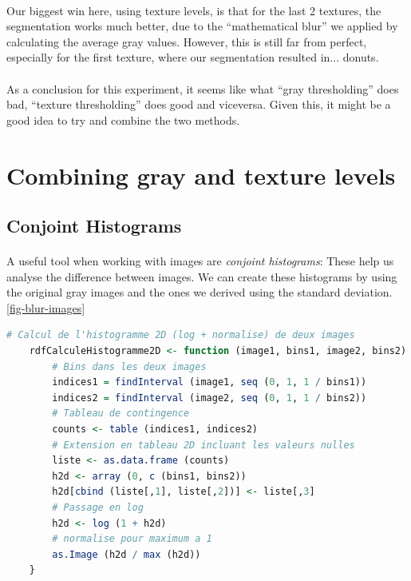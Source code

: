 \paragraph{}
Our biggest win here, using texture levels, is that for the last 2 textures, the segmentation works much better, due to the ``mathematical blur'' we applied by calculating the average gray values.
However, this is still far from perfect, especially for the first texture, where our segmentation resulted in... donuts.
\paragraph{}
As a conclusion for this experiment, it seems like what ``gray thresholding'' does bad, ``texture thresholding'' does good and viceversa.
Given this, it might be a good idea to try and combine the two methods.

\clearpage

\section{Combining gray and texture levels}
\subsection{Conjoint Histograms}
\paragraph{}
A useful tool when working with images are \emph{conjoint histograms}: \cite{wiki_conjoint_histograms}
These help us analyse the difference between images.
We can create these histograms by using the original gray images and the ones we derived using the standard deviation. \ref{fig-blur-images}

\begin{lstlisting}[language=R, caption=Calculating conjoint histograms]
    # Calcul de l'histogramme 2D (log + normalise) de deux images
    rdfCalculeHistogramme2D <- function (image1, bins1, image2, bins2) {
        # Bins dans les deux images
        indices1 = findInterval (image1, seq (0, 1, 1 / bins1))
        indices2 = findInterval (image2, seq (0, 1, 1 / bins2))
        # Tableau de contingence
        counts <- table (indices1, indices2)
        # Extension en tableau 2D incluant les valeurs nulles
        liste <- as.data.frame (counts)
        h2d <- array (0, c (bins1, bins2))
        h2d[cbind (liste[,1], liste[,2])] <- liste[,3]
        # Passage en log
        h2d <- log (1 + h2d)
        # normalise pour maximum a 1
        as.Image (h2d / max (h2d))
    }
\end{lstlisting}

